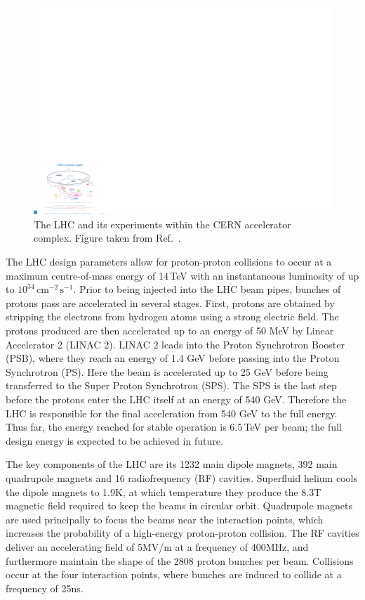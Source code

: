 \begin{figure}[h!]
  \centering
  \includegraphics[width=\textwidth]{Figures/Detector/CERNschematic.pdf}
  \caption[The CERN accelerator complex.]
  {The LHC and its experiments within the CERN accelerator complex.
  Figure taken from Ref.~\cite{CERNcomplex}.}
  \label{fig:detector_CERNschematic}
\end{figure}

The LHC design parameters allow for proton-proton collisions to occur at a maximum centre-of-mass energy of 14\,TeV with an instantaneous luminosity of up to $10^{34}\,\textrm{cm}^{-2}\,\textrm{s}^{-1}$.
Prior to being injected into the LHC beam pipes, bunches of protons pass are accelerated in several stages. 
First, protons are obtained by stripping the electrons from hydrogen atoms using a strong electric field.
The protons produced are then accelerated up to an energy of 50 MeV by Linear Accelerator 2 (LINAC 2).
LINAC 2 leads into the Proton Synchrotron Booster (PSB), where they reach an energy of 1.4 GeV before passing into the Proton Synchrotron (PS).
Here the beam is accelerated up to 25 GeV before being transferred to the Super Proton Synchrotron (SPS).
The SPS is the last step before the protons enter the LHC itself at an energy of 540 GeV.
Therefore the LHC is responsible for the final acceleration from 540 GeV to the full energy.
Thus far, the energy reached for stable operation is 6.5\,TeV per beam; the full design energy is expected to be achieved in future.

The key components of the LHC are its 1232 main dipole magnets, 392 main quadrupole magnets and 16 radiofrequency (RF) cavities.
Superfluid helium cools the dipole magnets to 1.9K, at which temperature they produce the 8.3T magnetic field required to keep the beams in circular orbit.
Quadrupole magnets are used principally to focus the beams near the interaction points, which increases the probability of a high-energy proton-proton collision.
The RF cavities deliver an accelerating field of 5MV/m at a frequency of 400MHz, and furthermore maintain the shape of the 2808 proton bunches per beam.
Collisions occur at the four interaction points, where bunches are induced to collide at a frequency of 25ns. 


